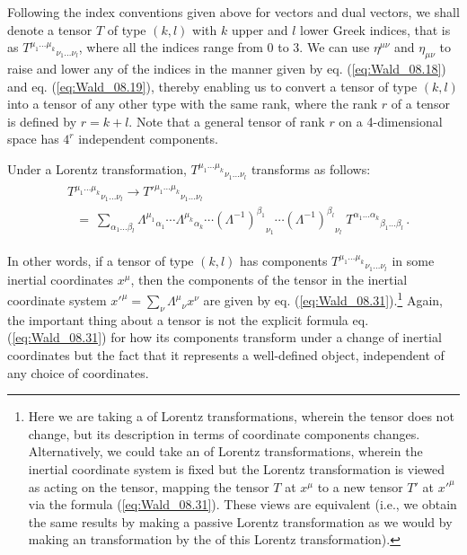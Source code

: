 Following the index conventions given above for vectors and dual vectors, we shall denote a tensor $T$ of type $(k,l)$ with 
$k$ upper and $l$ lower Greek indices, 
that is as ${T^{\mu_1\ldots\mu_k}}_{\nu_1\ldots\nu_l}$, 
where all the indices range from 0 to 3. 
We can use $\eta^{\mu\nu}$ and $\eta_{\mu\nu}$ to raise and lower any of the indices in the manner given by 
eq. (\ref{eq:Wald_08.18}) and eq. (\ref{eq:Wald_08.19}), thereby enabling us to convert a tensor of type $(k,l)$ into a tensor 
of any other type with the same rank, where the rank $r$ of a tensor is defined by $r = k + l$. 
Note that a general tensor of rank $r$ on a 4-dimensional space has $4^r$ independent components. 

Under a Lorentz transformation, ${T^{\mu_1\ldots\mu_k}}_{\nu_1\ldots\nu_l}$ transforms as follows:
\begin{align}\label{eq:Wald_08.31}
\begin{split}
& {T^{\mu_1\ldots\mu_k}}_{\nu_1\ldots\nu_l} \longrightarrow {{T'}^{\mu_1\ldots\mu_k}}_{\nu_1\ldots\nu_l} \\
& \:\:\:=\: \sum_{\alpha_1\ldots\beta_l} 
{\Lambda^{\mu_1}}_{\alpha_1} \cdots {\Lambda^{\mu_k}}_{\alpha_k} \cdots {(\Lambda^{-1})^{\beta_1}}_{\nu_1} \cdots {(\Lambda^{-1})^{\beta_l}}_{\nu_l}\; {T^{\alpha_1\ldots\alpha_k}}_{\beta_1\ldots\beta_l} \,.
\end{split}
\end{align}

In other words, if a tensor of type $(k, l)$ has components ${T^{\mu_1\ldots\mu_k}}_{\nu_1\ldots\nu_l}$ in some inertial coordinates $x^\mu$, then the components of the tensor in the inertial coordinate system ${x'}^\mu = \sum_\nu {\Lambda^\mu}_\nu x^\nu$ are given by eq. (\ref{eq:Wald_08.31}).\footnote{Here we are taking a  of Lorentz transformations, wherein the tensor does not change, but its description in terms of coordinate components changes. Alternatively, we could take an  of Lorentz transformations, wherein the inertial coordinate system is fixed but the Lorentz transformation is viewed as acting on the tensor, mapping the tensor $T$ at $x^\mu$ to a new tensor $T'$ at ${x'}^\mu$ via the formula (\ref{eq:Wald_08.31}). These views are equivalent (i.e., we obtain the same results by making a passive Lorentz transformation as we would by making an  transformation by the  of this Lorentz transformation).} 
Again, the important thing about a tensor is not the explicit formula eq. (\ref{eq:Wald_08.31}) for how its components transform under a change of inertial coordinates but the fact that it represents a well-defined object, independent of any choice of coordinates. 

